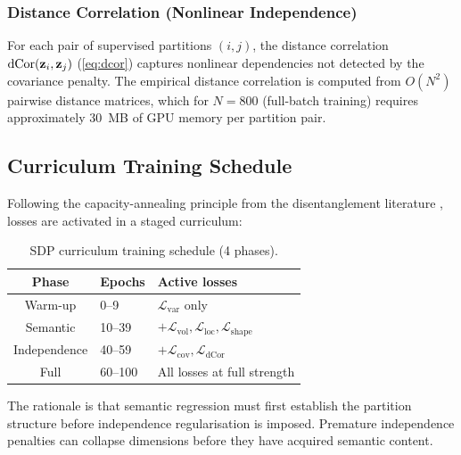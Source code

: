 \subsubsection{Distance Correlation (Nonlinear Independence)}

For each pair of supervised partitions $(i, j)$, the distance correlation
$\operatorname{dCor}(\mathbf{z}_i, \mathbf{z}_j)$ (\cref{eq:dcor}) captures nonlinear
dependencies not detected by the covariance penalty. The empirical distance
correlation is computed from $O(N^2)$ pairwise distance matrices, which for
$N = 800$ (full-batch training) requires approximately 30~MB of GPU memory
per partition pair.

\subsection{Curriculum Training Schedule}
\label{sec:sdp:curriculum}

Following the capacity-annealing principle from the disentanglement literature
\cite{burgess2018understanding}, losses are activated in a staged curriculum:

\begin{table}[H]
  \centering
  \caption{SDP curriculum training schedule (4 phases).}
  \label{tab:curriculum}
  \begin{tabular}{clp{7cm}}
    \toprule
    \textbf{Phase} & \textbf{Epochs} & \textbf{Active losses} \\
    \midrule
    Warm-up     & 0--9    & $\mathcal{L}_{\text{var}}$ only \\
    Semantic    & 10--39  & $+ \mathcal{L}_{\text{vol}}, \mathcal{L}_{\text{loc}}, \mathcal{L}_{\text{shape}}$ \\
    Independence & 40--59 & $+ \mathcal{L}_{\text{cov}}, \mathcal{L}_{\text{dCor}}$ \\
    Full         & 60--100 & All losses at full strength \\
    \bottomrule
  \end{tabular}
\end{table}

The rationale is that semantic regression must first establish the partition
structure before independence regularisation is imposed. Premature
independence penalties can collapse dimensions before they have acquired
semantic content.

